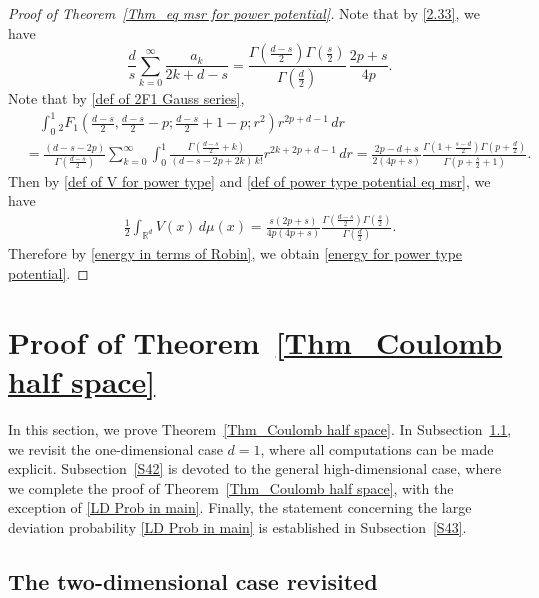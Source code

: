 \documentclass[10pt]{amsart}
\def\R{\mathbb{R}}
\theoremstyle{plain}
\theoremstyle{remark}
\numberwithin{equation}{section}
\begin{document}
\begin{proof}[Proof of Theorem~\ref{Thm_eq msr for power potential}]
Note that by \eqref{2.33}, we have 
\begin{equation}
\frac{d}{s} \sum_{k=0}^\infty \frac{ a_k}{ 2k+d-s }  =  \frac{ \Gamma( \tfrac{d-s}{2} ) \Gamma(\frac{s}{2})}{ \Gamma( \frac{d}{2} ) } \, \frac{2p+s}{ 4 p  }.
\end{equation} 
Note that by \eqref{def of 2F1 Gauss series}, 
\begin{align*}
&\quad \int_0^1  {}_2F_1( \tfrac{d-s}{2}, \tfrac{d-s}{2}-p; \tfrac{d-s}{2}+1-p; r^2 )r^{2p+d-1}\,dr 
\\
&= \frac{ (d-s-2p) }{ \Gamma(\tfrac{d-s}{2})   } \sum_{k=0}^\infty \int_0^1 \frac{ \Gamma(\tfrac{d-s}{2}+k)  }{ (d-s-2p+2k) \,k! } r^{2k+2p+d-1}\,dr  =    \frac{  2p-d+s }{ 2(4p+s) }   \frac{  \Gamma(1+\tfrac{s-d}{2}) \Gamma(p+\frac{d}{2}) }{ \Gamma(p+\frac{s}{2}+1) }  . 
\end{align*}
Then by \eqref{def of V for power type} and \eqref{def of power type potential eq msr}, we have 
\begin{align*}
\frac12 \int_{ \R^d } V(x) \,d\mu(x)  =   \frac{s(2p+s)}{ 4 p (4p+s) }  \frac{\Gamma(\frac{d-s}{2})  \Gamma(\tfrac{s}{2})  } {  \Gamma(\frac{d}{2}) }    . 
\end{align*} 
Therefore by \eqref{energy in terms of Robin}, we obtain \eqref{energy for power type potential}.   
\end{proof}
 











 

\section{Proof of Theorem~\ref{Thm_Coulomb half space}}\label{S3}
 
In this section, we prove Theorem~\ref{Thm_Coulomb half space}.
In Subsection~\ref{S41}, we revisit the one-dimensional case \( d=1 \), where all computations can be made explicit.
Subsection~\ref{S42} is devoted to the general high-dimensional case, where we complete the proof of Theorem~\ref{Thm_Coulomb half space}, with the exception of \eqref{LD Prob in main}.
Finally, the statement concerning the large deviation probability \eqref{LD Prob in main} is established in Subsection~\ref{S43}.



\subsection{The two-dimensional case revisited} \label{S41}
\end{document}
